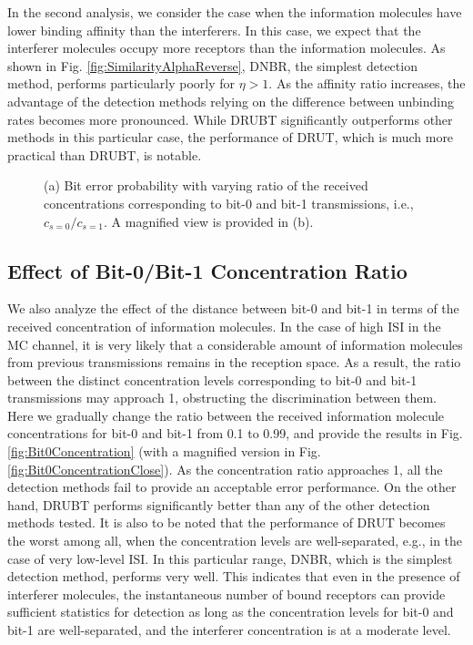 \documentclass[twocolumn]{IEEEtran}
\begin{document}
In the second analysis, we consider the case when the information molecules have lower binding affinity than the interferers. In this case, we expect that the interferer molecules occupy more receptors than the information molecules. As shown in Fig. \ref{fig:SimilarityAlphaReverse}, DNBR, the simplest detection method, performs particularly poorly for $\eta>1$.  As the affinity ratio increases, the advantage of the detection methods relying on the difference between unbinding rates becomes more pronounced. While DRUBT significantly outperforms other methods in this particular case, the performance of DRUT, which is much more practical than DRUBT, is notable. 

\begin{figure*}[!t]
	\centering
	\caption{(a) Bit error probability with varying ratio of the received concentrations corresponding to bit-0 and bit-1 transmissions, i.e., $c_{s=0}/c_{s=1}$. A magnified view is provided in (b).}
	\label{fig:Bit0ConcentrationMain}
\end{figure*}
\subsection{Effect of Bit-0/Bit-1 Concentration Ratio}
We also analyze the effect of the distance between bit-0 and bit-1 in terms of the received concentration of information molecules. In the case of high ISI in the MC channel, it is very likely that a considerable amount of information molecules from previous transmissions remains in the reception space. As a result, the ratio between the distinct concentration levels corresponding to bit-0 and bit-1 transmissions may approach 1, obstructing the discrimination between them. Here we gradually change the ratio between the received information molecule concentrations for bit-0 and  bit-1 from 0.1 to 0.99, and provide the results in Fig. \ref{fig:Bit0Concentration} (with a magnified version in Fig. \ref{fig:Bit0ConcentrationClose}). As the concentration ratio approaches 1, all the detection methods fail to provide an acceptable error performance. On the other hand, DRUBT performs significantly better than any of the other detection methods tested. It is also to be noted that the performance of DRUT becomes the worst among all, when the concentration levels are well-separated, e.g., in the case of very low-level ISI. In this particular range, DNBR, which is the simplest detection method, performs very well. This indicates that even in the presence of interferer molecules, the instantaneous number of bound receptors can provide sufficient statistics for detection as long as the concentration levels for bit-0 and bit-1 are well-separated, and the interferer concentration is at a moderate level. 
\end{document}
